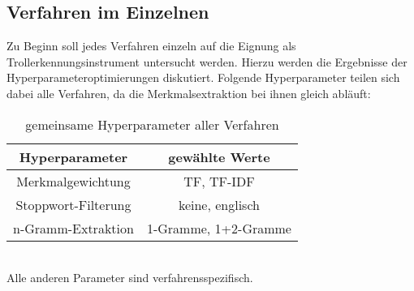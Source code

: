 \subsection{Verfahren im Einzelnen}
Zu Beginn soll jedes Verfahren einzeln auf die Eignung als Trollerkennungsinstrument untersucht werden. Hierzu werden die Ergebnisse der Hyperparameteroptimierungen diskutiert. Folgende Hyperparameter teilen sich dabei alle Verfahren, da die Merkmalsextraktion bei ihnen gleich abläuft:
\begin{table}[htb]
	\begin{center}
		\begin{tabular}{|c|c|}
			\hline
			Hyperparameter & gewählte Werte \\ \hline \hline
			Merkmalgewichtung & TF, TF-IDF \\ \hline
			Stoppwort-Filterung & keine, englisch\\ \hline
			n-Gramm-Extraktion & 1-Gramme, 1+2-Gramme\\ \hline			
		\end{tabular}
		\caption{gemeinsame Hyperparameter aller Verfahren}\label{common-params}
	\end{center}
\end{table}\\
Alle anderen Parameter sind verfahrensspezifisch.
